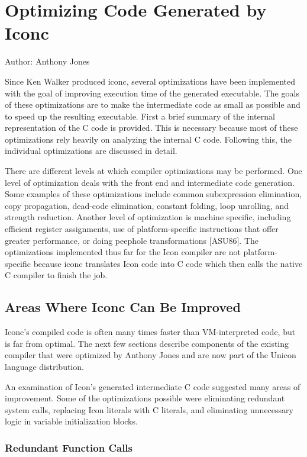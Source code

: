 \chapter{Optimizing Code Generated by Iconc}

Author: Anthony Jones

Since Ken Walker produced iconc, several optimizations have been
implemented with the goal of improving execution time of the generated
executable. The goals of these optimizations are to make the
intermediate code as small as possible and to speed up the resulting
executable. First a brief summary of the internal representation of
the C code is provided. This is necessary because most of these
optimizations rely heavily on analyzing the internal C code. Following
this, the individual optimizations are discussed in detail.

There are different levels at which compiler optimizations may be
performed. One level of optimization deals with the front end and
intermediate code generation. Some examples of these optimizations
include common subexpression elimination, copy propagation, dead-code
elimination, constant folding, loop unrolling, and strength reduction.
Another level of optimization is machine specific, including efficient
register assignments, use of platform-specific instructions that offer
greater performance, or doing peephole transformations [ASU86]. The
optimizations implemented thus far for the Icon compiler are not
platform-specific because iconc translates Icon code into C code which
then calls the native C compiler to finish the job.



\section{Areas Where Iconc Can Be Improved}

Iconc's compiled code is often many times faster than VM-interpreted
code, but is far from optimal. The next few sections describe
components of the existing compiler that were optimized by Anthony
Jones and are now part of the Unicon language distribution.

An examination of Icon's generated intermediate C code suggested many
areas of improvement. Some of the optimizations possible were
eliminating redundant system calls, replacing Icon literals with C
literals, and eliminating unnecessary logic in variable initialization
blocks.

\subsection{Redundant Function Calls}

